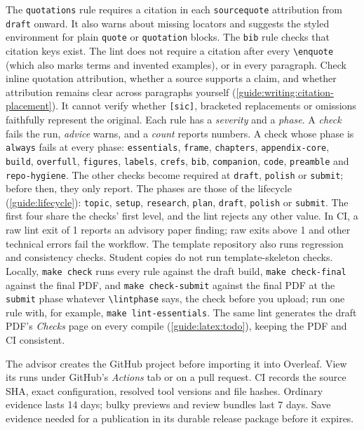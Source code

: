 The \texttt{quotations} rule requires a citation in each \texttt{sourcequote} attribution from \texttt{draft} onward. It also warns about missing locators and suggests the styled environment for plain \texttt{quote} or \texttt{quotation} blocks. The \texttt{bib} rule checks that citation keys exist. The lint does not require a citation after every \texttt{\textbackslash enquote} (which also marks terms and invented examples), or in every paragraph. Check inline quotation attribution, whether a source supports a claim, and whether attribution remains clear across paragraphs yourself (\cref{guide:writing:citation-placement}). It cannot verify whether \texttt{[sic]}, bracketed replacements or omissions faithfully represent the original.
Each rule has a \emph{severity} and a \emph{phase}. A \emph{check} fails the run, \emph{advice} warns, and a \emph{count} reports numbers. A check whose phase is \texttt{always} fails at every phase: \texttt{essentials}, \texttt{frame}, \texttt{chapters}, \texttt{appendix-core}, \texttt{build}, \texttt{overfull}, \texttt{figures}, \texttt{labels}, \texttt{crefs}, \texttt{bib}, \texttt{companion}, \texttt{code}, \texttt{preamble} and \texttt{repo-hygiene}. The other checks become required at \texttt{draft}, \texttt{polish} or \texttt{submit}; before then, they only report. The phases are those of the lifecycle (\cref{guide:lifecycle}): \texttt{topic}, \texttt{setup}, \texttt{research}, \texttt{plan}, \texttt{draft}, \texttt{polish} or \texttt{submit}. The first four share the checks' first level, and the lint rejects any other value. In CI, a raw lint exit of 1 reports an advisory paper finding; raw exits above 1 and other technical errors fail the workflow. The template repository also runs regression and consistency checks. Student copies do not run template-skeleton checks. Locally, \texttt{make check} runs every rule against the draft build, \texttt{make check-final} against the final PDF, and \texttt{make check-submit} against the final PDF at the \texttt{submit} phase whatever \texttt{\textbackslash lintphase} says, the check before you upload; run one rule with, for example, \texttt{make lint-essentials}. The same lint generates the draft PDF's \emph{Checks} page on every compile (\cref{guide:latex:todo}), keeping the PDF and CI consistent.

The advisor creates the GitHub project before importing it into Overleaf. View its runs under GitHub's \emph{Actions} tab or on a pull request. CI records the source SHA, exact configuration, resolved tool versions and file hashes. Ordinary evidence lasts 14 days; bulky previews and review bundles last 7 days. Save evidence needed for a publication in its durable release package before it expires.

